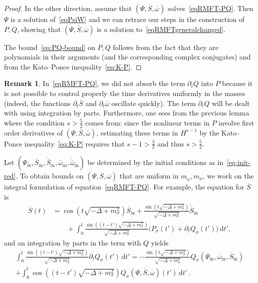 \documentclass[10pt]{amsart}
\theoremstyle{definition}\newtheorem{defi}[theo]{Definition}\newtheorem{rema}[theo]{Remark}\newtheorem{exam}[theo]{Example}\newtheorem{exem}[theo]{Example}\newtheorem{nota}[theo]{Notation}
\newcommand{\rmin}{\mathrm{in}}
\renewcommand\bar{\overline}
\renewcommand\d[1]{{\ensuremath{\,\text{d}#1}}}
\begin{document}
\begin{proof}
In the other direction, assume that $(\Psi,\overline{S}, \overline{\omega})$ solves~\eqref{eqRMFT-PQ}. Then $\Psi$ is a solution of~\eqref{eqPsiW} and we can retrace our steps in the construction of $P,Q$, showing that $(\Psi,\overline{S}, \overline{\omega})$ is a solution to~\eqref{eqRMFTgeneralchanged}.

The bound~\eqref{eq:PQ-bound} on $P,Q$ follows from the fact that they are polynomials in their arguments (and the corresponding complex conjugates) and from the Kato--Ponce inequality~\eqref{eq:K-P}.
\end{proof}

\begin{rema}
In~\eqref{eqRMFT-PQ}, we did not absorb the term $\partial_t Q$ into $P$ because it is not possible to control properly the time derivatives uniformly in the masses (indeed, the functions $\partial_t \bar{S}$ and $\partial_t \bar{\omega}$ oscillate quickly). The term $\partial_t Q$ will be dealt with using integration by parts. Furthermore, one sees from the previous lemma where the condition $s>\tfrac52$ comes from: since the nonlinear terms in $P$ involve first order derivatives of $(\Psi,\bar{S},\bar{\omega})$, estimating these terms in $H^{s-1}$ by the Kato--Ponce inequality~\eqref{eq:K-P} requires that $s-1>\tfrac32$ and thus $s>\tfrac52$.
\end{rema}

Let $(\Psi_\rmin, \overline{S}_\rmin, \dot{\overline{S}}_\rmin, \overline{\omega}_\rmin, \dot{\overline{\omega}}_\rmin)$ be determined by the initial conditions as in~\eqref{eq:init-red}. To obtain bounds on $(\Psi,\bar{S},\bar{\omega})$ that are uniform in $m_\omega, m_\sigma$, we work on the integral formulation of equation~\eqref{eqRMFT-PQ}. For example, the equation for $\overline{S}$ is
\begin{align*}
\overline{S}(t)&=\cos\left(t\sqrt{-\Delta + m_\sigma^2}\right)\overline{S}_\rmin +
\frac{\sin\left(t\sqrt{-\Delta + m_\sigma^2}\right)}{\sqrt{-\Delta + m_\sigma^2}}\dot{\overline{S}}_\rmin \\
& \qquad+
\int_0^t
\frac{\sin\left((t-t')\sqrt{-\Delta + m_\sigma^2}\right)}{\sqrt{-\Delta + m_\sigma^2}}\big(P_\sigma(t')+\partial_t Q_\sigma(t')\big)\d t',
\end{align*}
and an integration by parts in the term with $Q$ yields
\begin{multline*}
\int_0^t \frac{\sin\left((t-t')\sqrt{-\Delta + m_\sigma^2}\right)}{\sqrt{-\Delta + m_\sigma^2}}\partial_t Q_\sigma(t')\d t' 
= - \frac{\sin\left(t\sqrt{-\Delta + m_\sigma^2}\right) }{\sqrt{-\Delta + m_\sigma^2}} Q_\sigma\left(\Psi_\rmin, \overline{\omega}_\rmin, \overline{S}_\rmin\right)\\ +\int_0^t \cos\left((t-t')\sqrt{-\Delta+ m_\sigma^2}\right)Q_\sigma\left(\Psi, \overline{S}, \overline{\omega}\right)(t')\d t' \,.
\end{multline*}
\end{document}
